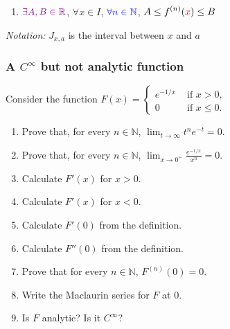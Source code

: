 \documentclass[14pt]{beamer}
\begin{document}
\begin{frame}[t]
\begin{enumerate}
			\item $\displaystyle{\color{violet} \exists A, B \in \mathbb{R}}$, \;
				{\color{red} $\displaystyle \forall x \in I$}, \; $\displaystyle{\color{blue} \forall n \in \mathbb{N}}$,
				\; $\displaystyle A \leq f^{(n)}({\color{red} x}) \leq B$
		\end{enumerate}
		\vspace{.5cm}

		\emph{Notation:} $\displaystyle J_{x,a}$ is the interval between $x$ and $a$
	\end{frame}

	\begin{frame}[t]
		\fontsize{13}{13}\selectfont
		\frametitle{A $\displaystyle C^{\infty}$ but not analytic function}

		Consider the function $\displaystyle F(x) =
		\begin{cases}
			e^{-1/x} & \text{ if }x >0,     \\
			0        & \text{ if }x \leq 0.
		\end{cases}$

		\begin{enumerate}
			\item Prove that, for every $n \in \mathbb{N}$, $\displaystyle \lim_{t \to
				\infty}t^{n}e^{-t}=0$.

			\item Prove that, for every $n \in \mathbb{N}$, $\displaystyle \lim_{x \to
				0^+}\frac{e^{-1/x}}{x^{n}}=0$.

			\item Calculate $\displaystyle F'(x)$ for $x>0$.

			\item Calculate $\displaystyle F'(x)$ for $x <0$.

			\item Calculate $\displaystyle F'(0)$ from the definition.

			\item Calculate $\displaystyle F''(0)$ from the definition.

			\item Prove that for every $n \in \mathbb{N}$,
				$\displaystyle F^{(n)}(0) = 0$.

			\item Write the Maclaurin series for $F$ at $0$.

			\item Is $F$ analytic? Is it $C^{\infty}$?
		\end{enumerate}
	\end{frame}
\end{document}
